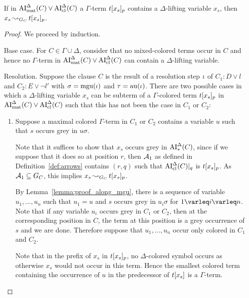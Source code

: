 \documentclass[,%
	draft=false,%
	numbers=noendperiod
	11pt,
	a4paper,
	oneside,%
	openany,
]{memoir}
\begin{document}
\begin{lemma}
	If in $\operatorname{AI}_\mathrm{mat}^\Delta(C) \lor \operatorname{AI}_\mathrm{cl}^\Delta(C)$ a
	$\Gamma$-term $t{[x_s]_{p}}$ contains a $\Delta$-lifting variable $x_s$, then $x_s \operatorname{\leadsto}_{G_C} t{[x_s]_{p}}$.
\end{lemma}
\begin{proof}
	We proceed by induction.

	\begin{description}
		\item{}Base case.
			For $C \in \Gamma\cup\Delta$, consider that no mixed-colored terms occur in $C$ and hence no $\Gamma$-term in $\operatorname{AI}_\mathrm{mat}^\Delta(C) \lor \operatorname{AI}_\mathrm{cl}^\Delta(C)$ can contain a $\Delta$-lifting variable.

		\item{}Resolution.
			Suppose the clause $C$ is the result of a resolution step $\iota$ of $C_1: D \lor l$ and $C_2: E \lor \lnot l'$ with $\sigma = \operatorname{mgu}(\iota)$ and $\tau = \operatorname{au}(\iota)$.
			There are two possible cases in which a $\Delta$-lifting variable $x_s$ can be subterm of a $\Gamma$-colored term $t{[x_s]_{p}}$ in $\operatorname{AI}_\mathrm{mat}^\Delta(C)\lor \operatorname{AI}_\mathrm{cl}^\Delta(C)$ such that this has not been the case in $C_1$ or $C_2$:

			\begin{enumerate}

				\item Suppose a maximal colored $\Gamma$-term in $C_1$ or $C_2$ contains a variable $u$ such that $s$ occurs grey in $u\sigma$.
					\label{25_1}

					Note that it suffices to show that $x_s$ occurs grey in $\operatorname{AI}_\mathrm{*}^\Delta(C)$,
					since if we suppose that it does so at position $r$,
					then $\operatorname{\mathcal{A}}_1$ as defined in Definition~\ref{def:arrows} contains $(r, q)$ such that $\operatorname{AI}_\mathrm{cl}^\Delta(C)|_{q}$ is $t{[x_s]_{p}}$.
					As $\operatorname{\mathcal{A}}_1 \subseteq G_C$, this implies $x_s \operatorname{\leadsto}_{G_C} t{[x_s]_{p}}$.


					By Lemma~\ref{lemma:proof_along_mgu}, there is a sequence of variable $u_1, \dots, u_n$ such that $u_1 = u$ and $s$ occurs grey in $u_i \sigma$ for $1\varleq i \varleq n$.
					Note that if any variable $u_i$ occurs grey in $C_1$ or $C_2$, then at the corresponding position in $C$, the term at this position is a grey occurrence of $s$ and we are done.
					Therefore suppose that $u_1, \dots, u_n$ occur only colored in $C_1$ and $C_2$.

					Note that in the prefix of $x_s$ in $t{[x_s]_{p}}$, no $\Delta$-colored symbol occurs as otherwise $x_s$ would not occur in this term.
					Hence the smallest colored term containing the occurrence of $u$ in the predecessor of $t[x_s]$ is a $\Gamma$-term.


\end{enumerate}
\end{description}
\end{proof}
\end{document}

